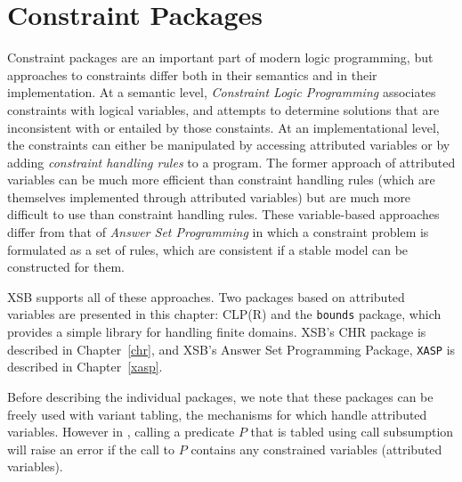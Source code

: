 \chapter{Constraint Packages}

Constraint packages are an important part of modern logic programming,
but approaches to constraints differ both in their semantics and in
their implementation.  At a semantic level, {\em Constraint Logic
  Programming} associates constraints with logical variables, and
attempts to determine solutions that are inconsistent with or entailed
by those constaints.  At an implementational level, the constraints
can either be manipulated by accessing attributed variables or by
adding {\em constraint handling rules} to a program.  The former
approach of attributed variables can be much more efficient than
constraint handling rules (which are themselves implemented through
attributed variables) but are much more difficult to use than
constraint handling rules.  These variable-based approaches differ
from that of {\em Answer Set Programming} in which a constraint
problem is formulated as a set of rules, which are consistent if a
stable model can be constructed for them.

XSB supports all of these approaches.  Two packages based on
attributed variables are presented in this chapter: CLP(R) and the
{\tt bounds} package, which provides a simple library for handling
finite domains.  XSB's CHR package is described in Chapter~\ref{chr},
and XSB's Answer Set Programming Package, {\tt XASP} is described in
Chapter~\ref{xasp}.

Before describing the individual packages, we note that these packages
can be freely used with variant tabling, the mechanisms for which
handle attributed variables.  However in \version{}, calling a
predicate $P$ that is tabled using call subsumption will raise an
error if the call to $P$ contains any constrained variables
(attributed variables).

